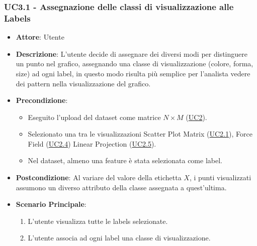     \subsubsection{UC3.1 - Assegnazione delle classi di visualizzazione alle Labels}
    \label{uc3.1}
    \begin{itemize}
    \item \textbf{Attore}: Utente
    \item \textbf{Descrizione}: L'utente decide di assegnare dei diversi modi per distinguere un punto nel grafico, assegnando una classe di visualizzazione (colore, forma, size) ad ogni label, in questo modo risulta più semplice per l'analista vedere dei pattern nella visualizzazione del grafico.
    \item \textbf{Precondizione}:
    \begin{itemize}
        \item Eseguito l'upload del dataset come matrice $N\times M$ (\hyperref[uc2]{UC2}).
        \item Selezionato una tra le visualizzazioni Scatter Plot Matrix (\hyperref[uc2.1]{UC2.1}), Force Field (\hyperref[uc2.4]{UC2.4}) Linear Projection (\hyperref[uc2.5]{UC2.5}).
        \item Nel dataset, almeno una feature è stata selezionata come label.
    \end{itemize}
    \item \textbf{Postcondizione}: Al variare del valore della etichetta $X$, i punti visualizzati assumono un diverso attributo della classe assegnata a quest'ultima.
    \item \textbf{Scenario Principale}: 
    \begin{enumerate}
        \item L'utente visualizza tutte le labels selezionate.
        \item L'utente associa ad ogni label una classe di visualizzazione.
    \end{enumerate}  
    \end{itemize}